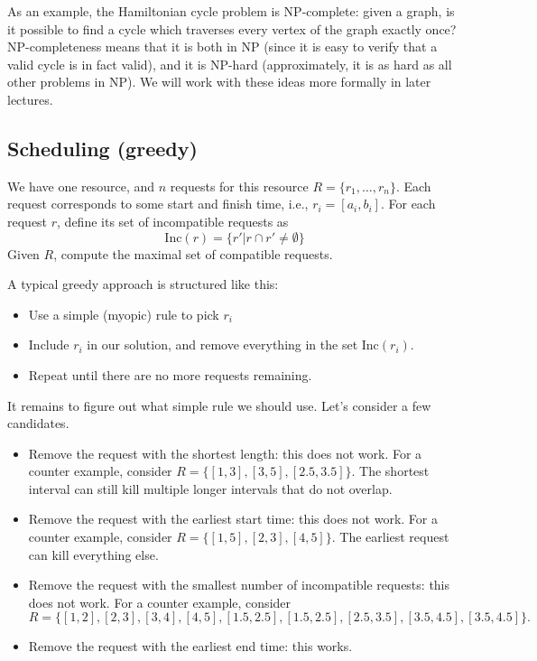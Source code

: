 As an example, the \ac{Hamiltonian cycle problem} is NP-complete: given a graph, is it possible to find a cycle which traverses every vertex of the graph exactly once? NP-completeness means that it is both in NP (since it is easy to verify that a valid cycle is in fact valid), and it is NP-hard (approximately, it is as hard as all other problems in NP). We will work with these ideas more formally in later lectures. 

\subsection{Scheduling (greedy)}

We have one resource, and $n$ requests for this resource $R = \{r_1, \hdots, r_n\}$. Each request corresponds to some start and finish time, i.e., $r_i = [a_i, b_i]$. For each request $r$, define its set of incompatible requests as
\[\text{Inc}(r) = \{r' | r\cap r' \neq \emptyset\}\]
Given $R$, compute the maximal set of compatible requests. 

\hrulebar

A typical greedy approach is structured like this: 
\begin{itemize}
\setlength \itemsep{0cm}
    \item Use a simple (myopic) rule to pick $r_i$
    \item Include $r_i$ in our solution, and remove everything in the set $\text{Inc}(r_i)$. 
    \item Repeat until there are no more requests remaining.
\end{itemize}

It remains to figure out what simple rule we should use. Let's consider a few candidates. 
\begin{itemize}
\setlength \itemsep{0cm}
\item Remove the request with the shortest length: this does not work. For a counter example, consider $R = \{[1,3], [3,5], [2.5, 3.5]\}$. The shortest interval can still kill multiple longer intervals that do not overlap. 
\item Remove the request with the earliest start time: this does not work. For a counter example, consider $R = \{[1,5], [2,3], [4,5]\}$. The earliest request can kill everything else. 
\item Remove the request with the smallest number of incompatible requests: this does not work. For a counter example, consider 
\[R = \{[1,2], [2,3], [3,4], [4,5], [1.5, 2.5], [1.5, 2.5], [2.5, 3.5], [3.5, 4.5], [3.5, 4.5]\}.\] 
\item Remove the request with the earliest end time: this works. 
\end{itemize}

